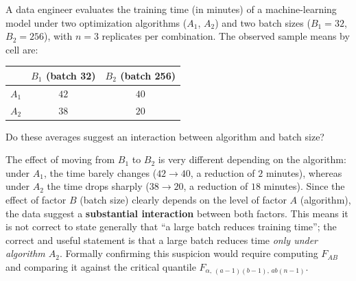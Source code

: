 \begin{ejemplo}
	\label{exmp:8.6.1}
	A data engineer evaluates the training time (in minutes) of a machine-learning model under two optimization algorithms ($A_1$, $A_2$) and two batch sizes ($B_1 = 32$, $B_2 = 256$), with $n=3$ replicates per combination. The observed sample means by cell are:
	\begin{center}
		\begin{tabular}{lcc}
			\hline
			 & $B_1$ (batch 32) & $B_2$ (batch 256) \\ \hline
			$A_1$ & $42$ & $40$ \\
			$A_2$ & $38$ & $20$ \\ \hline
		\end{tabular}
	\end{center}
	Do these averages suggest an interaction between algorithm and batch size?
\end{ejemplo}

\begin{solucion}
	The effect of moving from $B_1$ to $B_2$ is very different depending on the algorithm: under $A_1$, the time barely changes ($42 \to 40$, a reduction of $2$ minutes), whereas under $A_2$ the time drops sharply ($38 \to 20$, a reduction of $18$ minutes). Since the effect of factor $B$ (batch size) clearly depends on the level of factor $A$ (algorithm), the data suggest a \textbf{substantial interaction} between both factors. This means it is not correct to state generally that ``a large batch reduces training time''; the correct and useful statement is that a large batch reduces time \emph{only under algorithm $A_2$}. Formally confirming this suspicion would require computing $F_{AB}$ and comparing it against the critical quantile $F_{\alpha,\,(a-1)(b-1),\,ab(n-1)}$.
\end{solucion}
